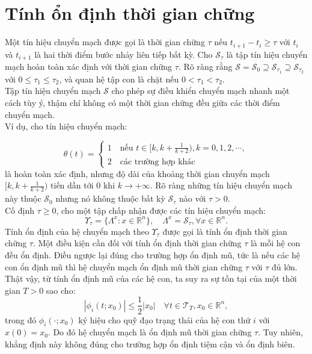 \documentclass[14pt,a4paper,oneside]{report}		%
\begin{document}
\section{Tính ổn định thời gian chững}
Một tín hiệu chuyển mạch được gọi là thời gian chững $\tau$ nếu $t_{i+1}-t_i\geq\tau$ với $t_i$ và $t_{i+1}$ là hai thời điểm bước nhảy liên tiếp bất kỳ. Cho $\mathcal{S}_\tau$ là tập tín hiệu chuyển mạch hoàn toàn xác định với thời gian chững $\tau$. Rõ ràng rằng $\mathcal{S}=\mathcal{S}_0\supseteq\mathcal{S}_{\tau_1}\supseteq\mathcal{S}_{\tau_2}$ với $0\leq\tau_1\leq\tau_2$, và quan hệ tập con là chặt nếu $0<\tau_1<\tau_2$.\\

Tập tín hiệu chuyển mạch $\mathcal{S}$ cho phép sự điều khiển chuyển mạch nhanh một cách tùy ý, thậm chí không có một thời gian chững đều giữa các thời điểm chuyển mạch.\\

Ví dụ, cho tín hiệu chuyển mạch:

$$\theta(t)=\begin{cases}
1\quad\text{nếu } t\in[k,k+\frac{1}{k+2}), k=0,1,2,\cdots,\\
2\quad\text{các trường hợp khác}
\end{cases}$$
là hoàn toàn xác định, nhưng độ dài của khoảng thời gian chuyển mạch $[k,k+\frac{1}{k+2})$ tiến dần tới $0$ khi $k\rightarrow +\infty$. Rõ ràng những tín hiệu chuyển mạch này thuộc $\mathcal{S}_0$ nhưng nó không thuộc bất kỳ $\mathcal{S}_\tau$ nào với $\tau>0$.\\

Cố định $\tau \geq 0$, cho một tập chấp nhận được các tín hiệu chuyển mạch:
$$\Upsilon_\tau=\{\Lambda^x:x\in\mathbb{R}^n\},\quad \Lambda^x=\mathcal{S}_\tau,\forall x\in\mathbb{R}^n.$$
Tính ổn định của hệ chuyển mạch theo $\Upsilon_\tau$ được gọi là tính ổn định thời gian chững $\tau$. Một điều kiện cần đối với tính ổn định thời gian chững $\tau$ là mỗi hệ con đều ổn định. Điều ngược lại đúng cho trường hợp ổn định mũ, tức là nếu các hệ con ổn định mũ thì hệ chuyển mạch ổn định mũ thời gian chững $\tau$ với $\tau$ đủ lớn. Thật vậy, từ tính ổn định mũ của các hệ con, ta suy ra sự tồn tại của một thời gian $T>0$ sao cho:
$$|\phi_i(t;x_0)|\leq\frac{1}{2}|x_0|\quad\forall t\in\mathcal{T}_T,x_0\in\mathbb{R}^n,$$
trong đó $\phi_i(\cdot;x_0)$ ký hiệu cho quỹ đạo trạng thái của hệ con thứ $i$ với $x(0) = x_0$. Do đó hệ chuyển mạch là ổn định mũ thời gian chững $\tau$. Tuy nhiên, khẳng định này không đúng cho trường hợp ổn định tiệm cận và ổn định biên.
\end{document}

